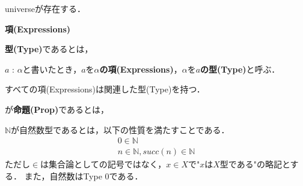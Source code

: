 %




%

\begin{definition}
    universeが存在する．
\end{definition}

\begin{definition}
    \textbf{項(Expressions)}
\end{definition}

\begin{definition}
    \textbf{型(Type)}であるとは，
\end{definition}

\begin{definition}
    $a$ : $\alpha$と書いたとき，$a$を\textbf{$\alpha$の項(Expressions)}，$\alpha$を\textbf{$a$の型(Type)}と呼ぶ．
\end{definition}

\begin{theorem}[関数型言語より]
    すべての項(Expressions)は関連した型(Type)を持つ．
\end{theorem}

\begin{definition}
    が\textbf{命題(Prop)}であるとは，
\end{definition}

\begin{definition}
    $\mathbb{N}$が自然数型であるとは，以下の性質を満たすことである．
    \begin{align}
        0 \in \mathbb{N}\\
        n\in\mathbb{N},succ(n)\in \mathbb{N}
    \end{align}
    ただし$\in$は集合論としての記号ではなく，$x\in X$で"$x$は$X$型である"の略記とする．
    また，自然数はType 0である．
\end{definition}

